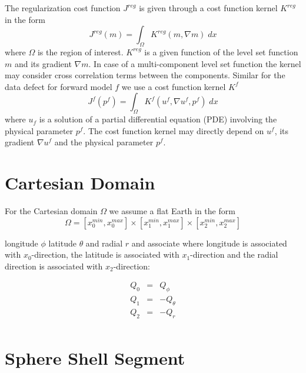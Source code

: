 The regularization cost function $J^{reg}$ is given through a cost function
kernel $K^{reg}$ in the form
\begin{equation}\label{REF:EQU:INTRO 2a}
J^{reg}(m) = \int_{\Omega} K^{reg}(m, \nabla m) \; dx
\end{equation} 
where $\Omega$ is the region of interest. $K^{reg}$ is a given function of the
level set function $m$ and its gradient $\nabla m$.
In case of a multi-component level set function the kernel may consider cross
correlation terms between the components.
Similar for the data defect for forward model $f$ we use a cost function kernel $K^{f}$ 
\begin{equation}\label{REF:EQU:INTRO 2b}
J^{f}(p^f) = \int_{\Omega} K^{f}(u^f, \nabla u^f,p^f) \; dx
\end{equation} 
where $u_f$ is a solution of a partial differential equation (PDE) involving
the physical parameter $p^f$.
The cost function kernel may directly depend on $u^f$, its gradient
$\nabla u^f$ and the physical parameter $p^f$.


\section{Cartesian Domain}
For the Cartesian domain $\Omega$ we assume a flat Earth in the form
\begin{equation} \label{REF:EQU:INTRO 8}
\Omega = [x^{min}_0, x^{max}_0] \times
 [x^{min}_1, x^{max}_1] \times
 [x^{min}_2, x^{max}_2] 
\end{equation} 

longitude $\phi$ latitude $\theta$ and radial $r$
and associate where longitude is associated with $x_0$-direction,
the latitude is associated with $x_1$-direction and the radial direction is associated with $x_2$-direction: 

 \begin{equation}\label{REF:EQU:INTRO 9}
\begin{array}{rcl}
Q_0  & = &  Q_{\phi} \\
Q_1  & = & -Q_{\theta} \\
Q_2  & = & -Q_r \\
\end{array}
\end{equation}

\section{Sphere Shell Segment}

 
